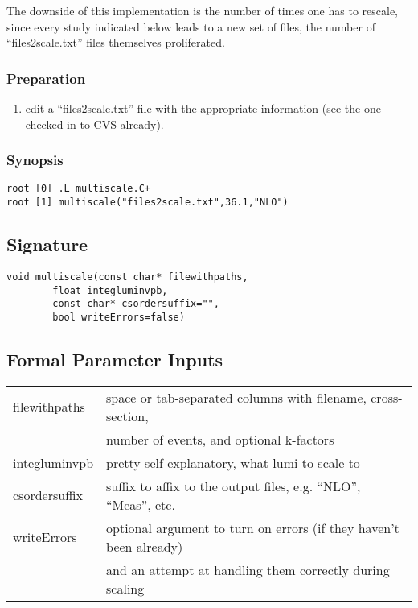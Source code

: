 \documentclass[english]{article}
\begin{document}
The downside of this implementation is the number of times one has to rescale,
since every study indicated below leads to a new set of files, the number
of ``files2scale.txt'' files themselves proliferated.

\subsubsection{Preparation}
\begin{enumerate}
\item edit a ``files2scale.txt'' file with the appropriate information
(see the one checked in to CVS already).
\end{enumerate}
\subsubsection{Synopsis}
\begin{lstlisting}
root [0] .L multiscale.C+
root [1] multiscale("files2scale.txt",36.1,"NLO")
\end{lstlisting}

\subsection{Signature}
\begin{lstlisting}
void multiscale(const char* filewithpaths,
		float integluminvpb,
		const char* csordersuffix="",
		bool writeErrors=false)
\end{lstlisting}

\subsection{Formal Parameter Inputs}
\begin{tabular}{|l|l|}
\hline
filewithpaths & space or tab-separated columns with filename, cross-section,  \\
              & number of events, and optional k-factors                      \\ \hline
integluminvpb & pretty self explanatory, what lumi to scale to                \\ \hline
csordersuffix & suffix to affix to the output files, e.g. ``NLO'', ``Meas'', etc. \\ \hline
writeErrors   & optional argument to turn on errors (if they haven't been already) \\
              & and an attempt at handling them correctly during scaling      \\ \hline
\end{tabular}
\end{document}
